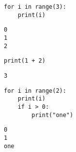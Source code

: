 
\begin{verbatim}
for i in range(3):
    print(i)
\end{verbatim}
\begin{verbatim}
0
1
2
\end{verbatim}

\begin{verbatim}
print(1 + 2)
\end{verbatim}
\begin{verbatim}
3
\end{verbatim}


\begin{verbatim}
for i in range(2):
    print(i)
    if i > 0:
        print("one")
\end{verbatim}
\begin{verbatim}
0
1
one
\end{verbatim}

